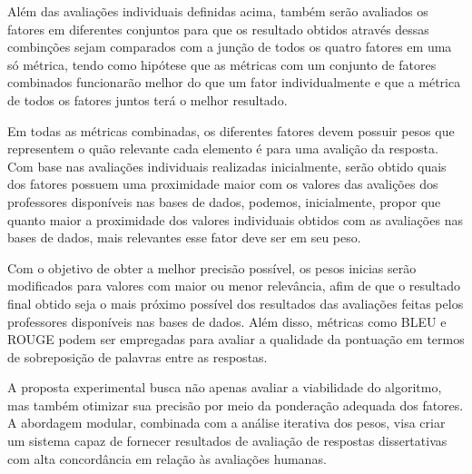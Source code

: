 Além das avaliações individuais definidas acima, também serão avaliados os fatores em diferentes conjuntos para que os resultado obtidos através dessas combinções sejam comparados com a junção de todos os quatro fatores em uma só métrica, tendo como hipótese que as métricas com um conjunto de fatores combinados funcionarão melhor do que um fator individualmente e que a métrica de todos os fatores juntos terá o melhor resultado. 

Em todas as métricas combinadas, os diferentes fatores devem possuir pesos que representem o quão relevante cada elemento é para uma avalição da resposta. Com base nas avaliações individuais realizadas inicialmente, serão obtido quais dos fatores possuem uma proximidade maior com os valores das avalições dos professores disponíveis nas bases de dados, podemos, inicialmente, propor que quanto maior a proximidade dos valores individuais obtidos com as avaliações nas bases de dados, mais relevantes esse fator deve ser em seu peso. 

Com o objetivo de obter a melhor precisão possível, os pesos inicias serão modificados para valores com maior ou menor relevância, afim de que o resultado final obtido seja o mais próximo possível dos resultados das avaliações feitas pelos professores disponíveis nas bases de dados. Além disso, métricas como BLEU e ROUGE podem ser empregadas para avaliar a qualidade da pontuação em termos de sobreposição de palavras entre as respostas.

A proposta experimental busca não apenas avaliar a viabilidade do algoritmo, mas também otimizar sua precisão por meio da ponderação adequada dos fatores. A abordagem modular, combinada com a análise iterativa dos pesos, visa criar um sistema capaz de fornecer resultados de avaliação de respostas dissertativas com alta concordância em relação às avaliações humanas.

\newpage